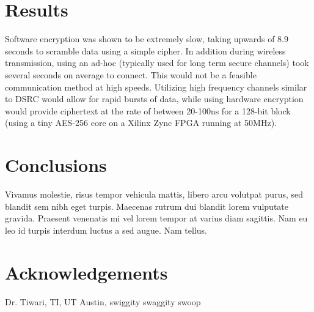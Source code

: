 \documentclass[a0,landscape]{a0poster}
\begin{document}
\begin{multicols}{3}
\section*{Results}
Software encryption was shown to be extremely slow, taking upwards of 8.9 seconds to scramble data using a simple cipher. In addition during wireless transmission, using an ad-hoc (typically used for long term secure channels) took several seconds on average to connect. This would not be a feasible communication method at high speeds. Utilizing high frequency channels similar to DSRC would allow for rapid bursts of data, while using hardware encryption would provide ciphertext at the rate of between 20-100ns for a 128-bit block (using a tiny AES-256 core on a Xilinx Zync FPGA running at 50MHz).



\color{SaddleBrown} %

\section*{Conclusions}
Vivamus molestie, risus tempor vehicula mattis, libero arcu volutpat purus, sed blandit sem nibh eget turpis. Maecenas rutrum dui blandit lorem vulputate gravida. Praesent venenatis mi vel lorem tempor at varius diam sagittis. Nam eu leo id turpis interdum luctus a sed augue. Nam tellus.



\section*{Acknowledgements}

Dr. Tiwari, TI, UT Austin, swiggity swaggity swoop


\end{multicols}
\end{document}
